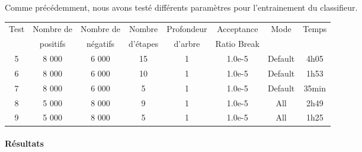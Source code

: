 \documentclass[11pt]{article}
\begin{document}
\noindent Comme précédemment, nous avons testé différents paramètres pour l'entrainement du classifieur. \bigbreak

\begin{center} 
    \begin{tabular}{|c|c|c|c|c|c|c|c|}
        \hline
        Test & Nombre de & Nombre de & Nombre & Profondeur & Acceptance  & Mode & Temps \\
        & positifs & négatifs & d'étapes & d'arbre & Ratio Break &  &  \\ 
        \hline 
        5 & 8 000 & 6 000 & 15 & 1 & 1.0e-5 & Default & 4h05 \\
        \hline
        6 & 8 000 & 6 000 & 10 & 1 & 1.0e-5 & Default & 1h53 \\
        \hline
        7 & 8 000 & 6 000 & 5 & 1 & 1.0e-5 & Default & 35min \\
        \hline
        8 & 5 000 & 8 000 & 9 & 1 & 1.0e-5 & All & 2h49 \\
        \hline
        9 & 5 000 & 8 000 & 5 & 1 & 1.0e-5 & All & 1h25 \\
        \hline
    \end{tabular}
\end{center}


\paragraph{Résultats}
\end{document}
